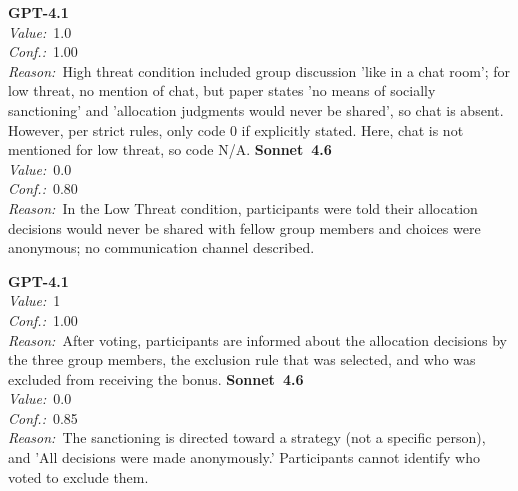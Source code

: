 \documentclass[11pt,a4paper]{article}
\begin{document}
\begin{tcolorbox}[
  title={\textbf{CONFIG\_chat} \textbar{} DOI: 10.1016\_j.jesp.2009.02.017 \textbar{} Cond.~0},
  colback=blue!3!white,
  colframe=blue!45!black,
  fonttitle=\small\sffamily,
  sidebyside,
  sidebyside align=top seam,
  lower separated=false,
  breakable,
  before upper={\small},
  before lower={\small},
]
\textbf{GPT-4.1}\\[2pt]
\textit{Value:}~1.0\\[3pt]
\textit{Conf.:}~1.00\\[3pt]
\textit{Reason:}~High threat condition included group discussion 'like in a chat room'; for low threat, no mention of chat, but paper states 'no means of socially sanctioning' and 'allocation judgments would never be shared', so chat is absent. However, per strict rules, only code 0 if explicitly stated. Here, chat is not mentioned for low threat, so code N/A.
\tcblower
\textbf{Sonnet~4.6}\\[2pt]
\textit{Value:}~0.0\\[3pt]
\textit{Conf.:}~0.80\\[3pt]
\textit{Reason:}~In the Low Threat condition, participants were told their allocation decisions would never be shared with fellow group members and choices were anonymous; no communication channel described.
\end{tcolorbox}

\begin{tcolorbox}[
  title={\textbf{CONFIG\_showPunishmentId} \textbar{} DOI: 10.1086\_720287 \textbar{} Cond.~0},
  colback=blue!3!white,
  colframe=blue!45!black,
  fonttitle=\small\sffamily,
  sidebyside,
  sidebyside align=top seam,
  lower separated=false,
  breakable,
  before upper={\small},
  before lower={\small},
]
\textbf{GPT-4.1}\\[2pt]
\textit{Value:}~1\\[3pt]
\textit{Conf.:}~1.00\\[3pt]
\textit{Reason:}~After voting, participants are informed about the allocation decisions by the three group members, the exclusion rule that was selected, and who was excluded from receiving the bonus.
\tcblower
\textbf{Sonnet~4.6}\\[2pt]
\textit{Value:}~0.0\\[3pt]
\textit{Conf.:}~0.85\\[3pt]
\textit{Reason:}~The sanctioning is directed toward a strategy (not a specific person), and 'All decisions were made anonymously.' Participants cannot identify who voted to exclude them.
\end{tcolorbox}
\end{document}
